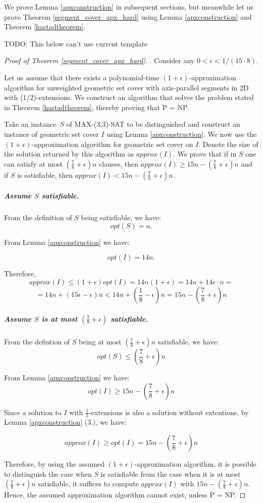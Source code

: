 We prove Lemma \ref{apxconstruction} in
subsequent sections, but meanwhile let us prove
Theorem \ref{segment_cover_apx_hard} using Lemma \ref{apxconstruction}
and Theorem \ref{hastadtheorem}.

TODO: This below can't use current template

\begin{proof}[Proof of Theorem \ref{segment_cover_apx_hard}].
Consider any $0 < \epsilon < 1/(15 \cdot 8)$.

Let us assume that there exists a polynomial-time
$(1+\epsilon)$-approximation algorithm
for unweighted geometric set cover with axis-parallel segments in 2D
with (1/2)-extensions.
We construct an algorithm that solves the problem stated in 
Theorem \ref{hastadtheorem}, thereby proving that P = NP.

Take an instance~$S$ of MAX-(3,3)-SAT to be distinguished
and construct an instance of geometric set cover $I$
using Lemma \ref{apxconstruction}.
We now use the $(1+\epsilon)$-approximation algorithm
for geometric set cover on $I$.
Denote the size of the solution returned by this algorithm as $approx(I)$.
We prove that 
if in $S$
one can satisfy at most $(\frac{7}{8}+\epsilon)n$ clauses,
then $approx(I) \ge 15n - (\frac{7}{8} + \epsilon)n$
and if $S$ is
satisfiable, then $approx(I) < 15n - (\frac{7}{8} + \epsilon)n$.

\subparagraph{Assume $S$ satisfiable.}
From the definition of $S$ being satisfiable, we have:
$$opt(S) = n.$$

From Lemma \ref{apxconstruction} we have:

$$opt(I) = 14n.$$

Therefore,
$$approx(I) \le (1+\epsilon)opt(I) = 14n(1+\epsilon)
	= 14n + 14\epsilon\cdot n =$$ 
	$$= 14n + (15\epsilon - \epsilon)n < 
  14n + \left(\frac{1}{8} - \epsilon\right)n 
= 15n - \left(\frac{7}{8} + \epsilon\right)n$$

\subparagraph{Assume $S$ is at most 
$\left(\frac{7}{8} + \epsilon\right)$ satisfiable.}
From the defintion of $S$ being at most 
$\left(\frac{7}{8} + \epsilon\right)n$ satisfiable, we have:
$$opt(S) \le \left(\frac{7}{8} + \epsilon\right)n$$

From Lemma \ref{apxconstruction} we have:
$$opt(I) \ge 15n - \left(\frac{7}{8} + \epsilon\right)n$$

Since a solution to $I$ with $\frac{1}{2}$-extensions is
also a solution without extentions, by 
Lemma \ref{apxconstruction} (3.), we have:

$$approx(I) \ge opt(I) = 15n - \left(\frac{7}{8} + \epsilon\right)n$$


Therefore, by using the assumed $(1+\epsilon)$-approximation
algorithm,
it is possible to distinguish the case when
$S$ is satisfiable from the case when it is
at most $(\frac{7}{8} + \epsilon)n$ satisfiable,
it suffices to compute $approx(I)$ with $15n - (\frac{7}{8}+\epsilon)n$.
Hence, the assumed approximation algorithm cannot exist, unless P = NP.

\end{proof}

